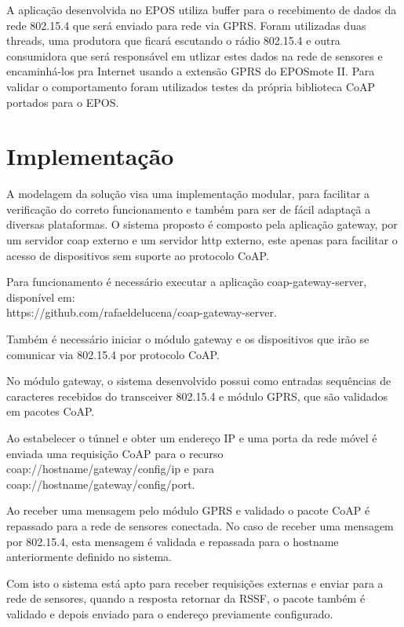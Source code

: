 A aplica\c{c}\~ao desenvolvida no EPOS utiliza buffer para o recebimento de dados da rede 802.15.4 que ser\'a enviado para rede via GPRS. Foram utilizadas duas threads, uma produtora que ficar\'a escutando o r\'adio 802.15.4 e outra consumidora que ser\'a respons\'avel em utlizar estes dados na rede de sensores e encaminh\'a-los pra Internet usando a extens\~ao GPRS do EPOSmote II. Para validar o comportamento foram utilizados testes da pr\'opria biblioteca CoAP portados para o EPOS.

\section{Implementa\c{c}\~ao}

A modelagem da solu\c{c}\~ao visa uma implementa\c{c}\~ao modular, para facilitar a verifica\c{c}\~ao do correto funcionamento e tamb\'em para ser de f\'acil adapta\c{c}\~a a diversas plataformas. O sistema proposto \'e composto pela aplica\c{c}\~ao gateway, por um servidor coap externo e um servidor http externo, este apenas para facilitar o acesso de dispositivos sem suporte ao protocolo CoAP.

Para funcionamento \'e necess\'ario executar a aplica\c{c}\~ao coap-gateway-server, dispon\'ivel em:\\https://github.com/rafaeldelucena/coap-gateway-server.

Tamb\'em \'e necess\'ario iniciar o m\'odulo gateway e os dispositivos que ir\~ao se comunicar via 802.15.4 por protocolo CoAP.

No m\'odulo gateway, o sistema desenvolvido possui como entradas sequ\^encias de caracteres recebidos do transceiver 802.15.4 e m\'odulo GPRS, que s\~ao validados em pacotes CoAP.

Ao estabelecer o t\'unnel e obter um endere\c{c}o IP e uma porta da rede m\'ovel \'e enviada uma requisi\c{c}\~ao CoAP para o recurso\\ coap://hostname/gateway/config/ip e para\\ coap://hostname/gateway/config/port.

Ao receber uma mensagem pelo m\'odulo GPRS e validado o pacote CoAP \'e repassado para a rede de sensores conectada.  No caso de receber uma mensagem por 802.15.4, esta mensagem \'e validada e repassada para o hostname anteriormente definido no sistema. 

Com isto o sistema est\'a apto para receber requisi\c{c}\~oes externas e enviar para a rede de sensores, quando a resposta retornar da RSSF, o pacote tamb\'em \'e validado e depois enviado para o endere\c{c}o previamente configurado.

